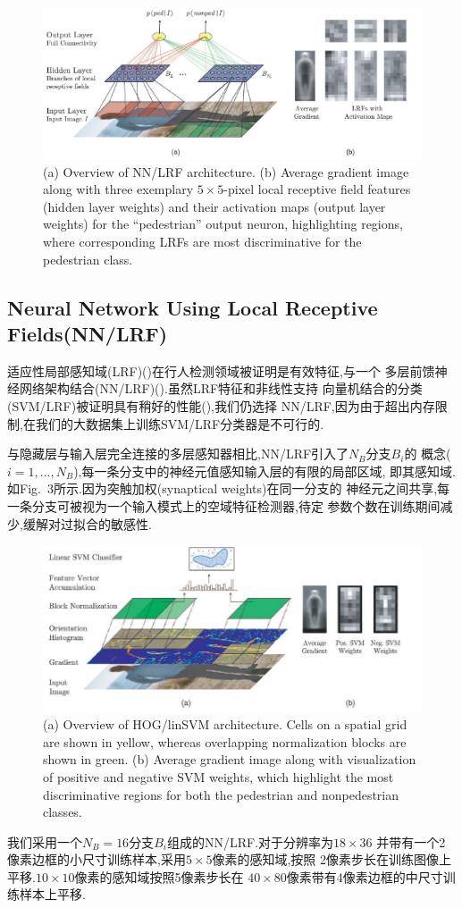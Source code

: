 \documentclass[10pt,letterpaper,journal,compsoc]{IEEEtran}
\begin{document}
\begin{figure}[!t]
\centering
\includegraphics[width=7in]{fig3.JPG}
\caption{(a) Overview of NN/LRF architecture. (b) Average gradient image along with three exemplary $5\times5$-pixel local receptive field features (hidden
layer weights) and their activation maps (output layer weights) for the “pedestrian” output neuron, highlighting regions, where corresponding LRFs
are most discriminative for the pedestrian class.}
\end{figure}
\subsection{Neural Network Using Local Receptive Fields(NN/LRF)}
适应性局部感知域(LRF)(\cite{bib19})在行人检测领域被证明是有效特征,与一个
多层前馈神经网络架构结合(NN/LRF)(\cite{bib75}).虽然LRF特征和非线性支持
向量机结合的分类(SVM/LRF)被证明具有稍好的性能(\cite{bib49}),我们仍选择
NN/LRF,因为由于超出内存限制,在我们的大数据集上训练SVM/LRF分类器是不可行的.

与隐藏层与输入层完全连接的多层感知器相比,NN/LRF引入了$N_B$分支$B_i$的
概念($i=1,...,N_B$),每一条分支中的神经元值感知输入层的有限的局部区域,
即其感知域.如Fig.~3所示.因为突触加权(synaptical weights)在同一分支的
神经元之间共享,每一条分支可被视为一个输入模式上的空域特征检测器,待定
参数个数在训练期间减少,缓解对过拟合的敏感性.

\begin{figure}[!t]
\centering
\includegraphics[width=7in]{fig4.JPG}
\caption{(a) Overview of HOG/linSVM architecture. Cells on a spatial grid are shown in yellow, whereas overlapping normalization blocks are shown in
green. (b) Average gradient image along with visualization of positive and negative SVM weights, which highlight the most discriminative regions for
both the pedestrian and nonpedestrian classes.}
\end{figure}
我们采用一个$N_B=16$分支$B_i$组成的NN/LRF.对于分辨率为$18\times36$
并带有一个2像素边框的小尺寸训练样本,采用$5\times5$像素的感知域,按照
2像素步长在训练图像上平移.$10\times10$像素的感知域按照5像素步长在
$40\times80$像素带有4像素边框的中尺寸训练样本上平移.
\end{document}
